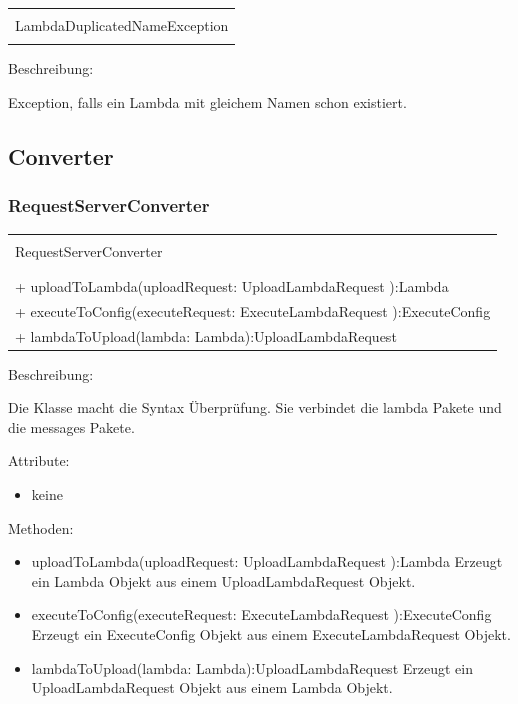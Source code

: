\documentclass[a4paper,20pt,oneside]{book}
\begin{document}
	
	\centering
	\begin{tabular}{|l|}
	\hline \\
	LambdaDuplicatedNameException\\ \hline
	\\ \hline
	\end{tabular}
	
	\raggedright
	\vspace{0.5cm}	
	
	Beschreibung:
	
	Exception, falls ein Lambda mit gleichem Namen schon existiert.
	
	\subsection{Converter}
	\subsubsection{RequestServerConverter}
	\centering
	\begin{tabular}{|l|}
	\hline \\
	RequestServerConverter\\
	\hline \\
    \hline \\
    + uploadToLambda(uploadRequest: UploadLambdaRequest ):Lambda \\
	+ executeToConfig(executeRequest: ExecuteLambdaRequest ):ExecuteConfig\\
	+ lambdaToUpload(lambda: Lambda):UploadLambdaRequest\\	
	\hline 
	\end{tabular}
	
	\raggedright
	\vspace{0.5cm}
	Beschreibung:
	
	Die Klasse macht die Syntax Überprüfung. Sie verbindet die lambda Pakete und die messages Pakete.
	
	\vspace{0.5cm}
	Attribute:
	\begin{itemize}
	\item keine \linebreak
    
	\end{itemize}
	
	Methoden:
	\begin{itemize}
	\item uploadToLambda(uploadRequest: UploadLambdaRequest ):Lambda\linebreak
	Erzeugt ein Lambda Objekt aus einem UploadLambdaRequest Objekt.
	\item executeToConfig(executeRequest: ExecuteLambdaRequest ):ExecuteConfig \linebreak
	Erzeugt ein ExecuteConfig Objekt aus einem ExecuteLambdaRequest Objekt.
	\item lambdaToUpload(lambda: Lambda):UploadLambdaRequest \linebreak
	Erzeugt ein UploadLambdaRequest Objekt aus einem Lambda Objekt.
	\end{itemize}
	
\end{document}
